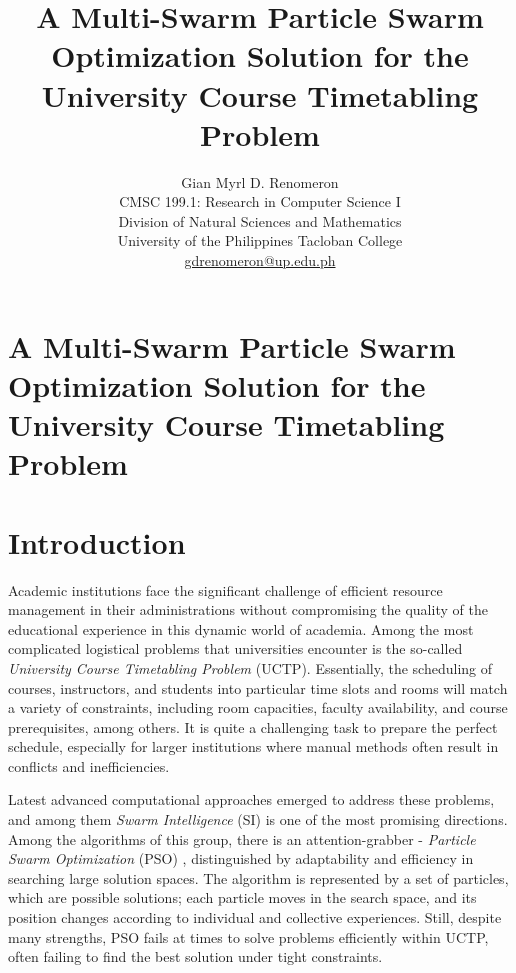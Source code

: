 \documentclass{article}
\begin{document}
\title{\textbf{A Multi-Swarm Particle Swarm Optimization Solution for the University Course Timetabling Problem}}
\author{Gian Myrl D. Renomeron\\
    CMSC 199.1: Research in Computer Science I\\
    Division of Natural Sciences and Mathematics\\
    University of the Philippines Tacloban College\\
    {\small \href{mailto:gdrenomeron@up.edu.ph}{gdrenomeron@up.edu.ph}}
}
\date{}

\maketitle
\pagebreak
    \section*{A Multi-Swarm Particle Swarm Optimization Solution for the University Course Timetabling Problem}

\section{Introduction}
\label{sec:introduction}

Academic institutions face the significant challenge of efficient resource management in their administrations without compromising the quality of the educational experience in this dynamic world of academia. \cite{Zhang2014-ak} Among the most complicated logistical problems that universities encounter is the so-called \textit{University Course Timetabling Problem} (UCTP). \cite{Arratia-Martinez2021-io} \cite{Oswald_C2013-zo} Essentially, the scheduling of courses, instructors, and students into particular time slots and rooms will match a variety of constraints, including room capacities, faculty availability, and course prerequisites, among others. \cite{Torres2021-ir} It is quite a challenging task to prepare the perfect schedule, especially for larger institutions where manual methods often result in conflicts and inefficiencies. \cite{Arratia-Martinez2021-io}

Latest advanced computational approaches emerged to address these problems, and among them \textit{Swarm Intelligence} (SI) is one of the most promising directions. \cite{Algethami2021-mm} Among the algorithms of this group, there is an attention-grabber - \textit{Particle Swarm Optimization} (PSO) \cite{kennedy1995particle}, distinguished by adaptability and efficiency in searching large solution spaces. \cite{Chen2013-cp} \cite{Ali2014-mb} The algorithm is represented by a set of particles, which are possible solutions; each particle moves in the search space, and its position changes according to individual and collective experiences. \cite{Gunawan2008-ga} Still, despite many strengths, PSO fails at times to solve problems efficiently within UCTP, often failing to find the best solution under tight constraints. \cite{Oswald_C2013-zo}
\end{document}
